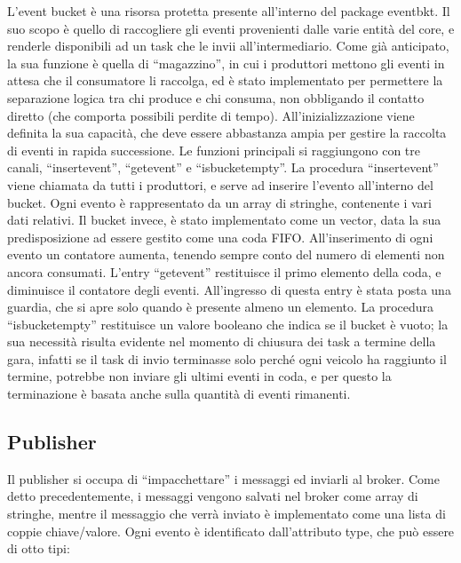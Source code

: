 L’event bucket è una risorsa protetta presente all’interno del package event\textunderscore bkt. Il suo scopo è quello di raccogliere gli eventi provenienti dalle varie entità del core, e renderle disponibili ad un task che le invii all’intermediario.
Come già anticipato, la sua funzione è quella di “magazzino”, in cui i produttori mettono gli eventi in attesa che il consumatore li raccolga, ed è stato implementato per permettere la separazione logica tra chi produce e chi consuma, non obbligando il contatto diretto (che comporta possibili perdite di tempo).
All’inizializzazione viene definita la sua capacità, che deve essere abbastanza ampia per gestire la raccolta di eventi in rapida successione.
Le funzioni principali si raggiungono con tre canali, “insert\textunderscore event”, “get\textunderscore event” e “is\textunderscore bucket\textunderscore empty”.
La procedura “insert\textunderscore event” viene chiamata da tutti i produttori, e serve ad inserire l’evento all’interno del bucket. Ogni evento è rappresentato da un array di stringhe, contenente i vari dati relativi. Il bucket invece, è stato implementato come un vector, data la sua predisposizione ad essere gestito come una coda FIFO. All’inserimento di ogni evento un contatore aumenta, tenendo sempre conto del numero di elementi non ancora consumati.
L’entry “get\textunderscore event” restituisce il primo elemento della coda, e diminuisce il contatore degli eventi. All’ingresso di questa entry è stata posta una guardia, che si apre solo quando è presente almeno un elemento.
La procedura “is\textunderscore bucket\textunderscore empty” restituisce un valore booleano che indica se il bucket è vuoto; la sua necessità risulta evidente nel momento di chiusura dei task a termine della gara, infatti se il task di invio terminasse solo perché ogni veicolo ha raggiunto il termine, potrebbe non inviare gli ultimi eventi in coda, e per questo la terminazione è basata anche sulla quantità di eventi rimanenti.

\subsection{Publisher}

Il publisher si occupa di “impacchettare” i messaggi ed inviarli al broker. Come detto precedentemente, i messaggi vengono salvati nel broker come array di stringhe, mentre il messaggio che verrà inviato è implementato come una lista di coppie chiave/valore.
Ogni evento è identificato dall’attributo type, che può essere di otto tipi:

